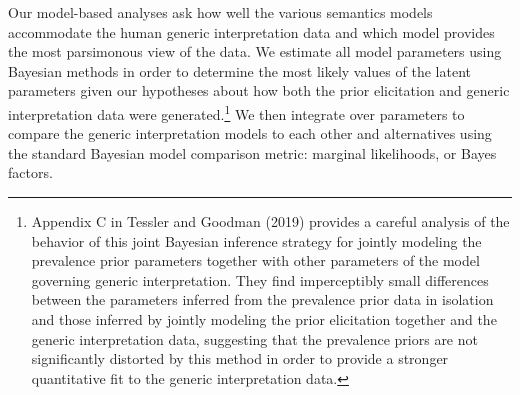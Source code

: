 \documentclass[floatsintext,doc]{apa6}
\let\rmarkdownfootnote\footnote%
\def\footnote{\protect\rmarkdownfootnote}
\newcommand{\ndg}[1]{{\textcolor{Green}{[ndg: #1]}}}
\begin{document}
Our model-based analyses ask how well the various semantics models accommodate the human generic interpretation data and which model provides the most parsimonous view of the data.
We estimate all model parameters using Bayesian methods in order to determine the most likely values of the latent parameters given our hypotheses about how both the prior elicitation and generic interpretation data were generated.\footnote{Appendix C in Tessler and Goodman (2019) provides a careful analysis of the behavior of this joint Bayesian inference strategy for jointly modeling the prevalence prior parameters together with other parameters of the model governing generic interpretation. They find imperceptibly small differences between the parameters inferred from the prevalence prior data in isolation and those inferred by jointly modeling the prior elicitation together and the generic interpretation data, suggesting that the prevalence priors are not significantly distorted by this method in order to provide a stronger quantitative fit to the generic interpretation data.}
We then integrate over parameters to compare the generic interpretation models to each other and alternatives using the standard Bayesian model comparison metric: marginal likelihoods, or Bayes factors.


\end{document}
